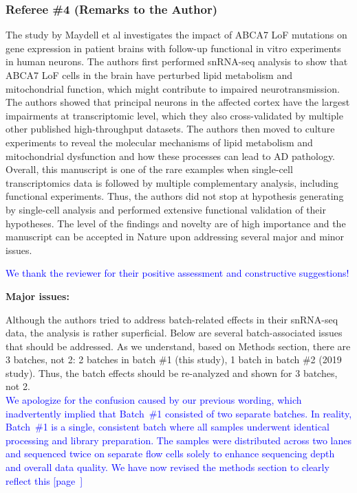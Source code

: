 \subsubsection*{Referee \#4 (Remarks to the Author)}

The study by Maydell et al investigates the impact of ABCA7 LoF mutations on gene expression in patient brains with follow-up functional in vitro experiments in human neurons. The authors first performed snRNA-seq analysis to show that ABCA7 LoF cells in the brain have perturbed lipid metabolism and mitochondrial function, which might contribute to impaired neurotransmission. The authors showed that principal neurons in the affected cortex have the largest impairments at transcriptomic level, which they also cross-validated by multiple other published high-throughput datasets. The authors then moved to culture experiments to reveal the molecular mechanisms of lipid metabolism and mitochondrial dysfunction and how these processes can lead to AD pathology. Overall, this manuscript is one of the rare examples when single-cell transcriptomics data is followed by multiple complementary analysis, including functional experiments. Thus, the authors did not stop at hypothesis generating by single-cell analysis and performed extensive functional validation of their hypotheses. The level of the findings and novelty are of high importance and the manuscript can be accepted in Nature upon addressing several major and minor issues.

\textcolor{blue}{We thank the reviewer for their positive assessment and constructive suggestions!}

\textbf{Major issues:}

Although the authors tried to address batch-related effects in their snRNA-seq data, the analysis is rather superficial. Below are several batch-associated issues that should be addressed. As we understand, based on Methods section, there are 3 batches, not 2: 2 batches in batch \#1 (this study), 1 batch in batch \#2 (2019 study). Thus, the batch effects should be re-analyzed and shown for 3 batches, not 2.\\
\textcolor{blue}{We apologize for the confusion caused by our previous wording, which inadvertently implied that Batch \#1 consisted of two separate batches. In reality, Batch \#1 is a single, consistent batch where all samples underwent identical processing and library preparation. The samples were distributed across two lanes and sequenced twice on separate flow cells solely to enhance sequencing depth and overall data quality. We have now revised the methods section to clearly reflect this [page~\pageref{quoteJ-label}]}

